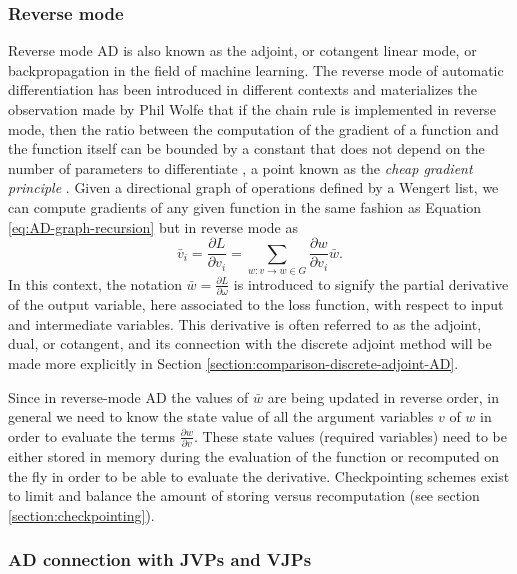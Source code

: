 \subsubsection{Reverse mode}

Reverse mode AD is also known as the adjoint, or cotangent linear mode, or backpropagation in the field of machine learning. 
The reverse mode of automatic differentiation has been introduced in different contexts \cite{griewank2012invented} and materializes the observation made by Phil Wolfe that if the chain rule is implemented in reverse mode, then the ratio between the computation of the gradient of a function and the function itself can be bounded by a constant that does not depend on the number of parameters to differentiate \cite{Griewank_1989, Wolfe_1982}, a point known as the \textit{cheap gradient principle} \cite{griewank2012invented}.  
Given a directional graph of operations defined by a Wengert list, we can compute gradients of any given function in the same fashion as Equation \eqref{eq:AD-graph-recursion} but in reverse mode as
\begin{equation}
    \bar v_i 
    = 
    \frac{\partial L}{\partial v_i}= \sum_{w : v \rightarrow w \in G} \frac{\partial w}{\partial v_i} \bar{w}.
    \label{eq:reverse-mode-ad-definition}
\end{equation}
In this context, the notation $\bar{w} = \frac{\partial L}{\partial \omega}$ is introduced to signify the partial derivative of the output variable, here associated to the loss function, with respect to input and intermediate variables. 
This derivative is often referred to as the adjoint, dual, or cotangent, and its connection with the discrete adjoint method will be made more explicitly in Section \ref{section:comparison-discrete-adjoint-AD}. 

Since in reverse-mode AD the values of $\bar w$ are being updated in reverse order, in general
we need to know the state value of all the argument variables $v$ of $w$ in order to evaluate the terms $\frac{\partial w}{\partial v}$.
These state values (required variables) need to be either stored in memory during the evaluation of the function or recomputed on the fly in order to be able to evaluate the derivative. 
Checkpointing schemes exist to limit and balance the amount of storing versus recomputation (see section \ref{section:checkpointing}).


\subsubsection{AD connection with JVPs and VJPs}
\label{sec:vjp-jvp}

